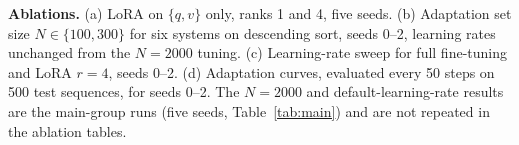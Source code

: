 \textbf{Ablations.} (a) LoRA on $\{q,v\}$ only, ranks 1 and 4, five seeds. (b) Adaptation set size $N\in\{100,300\}$ for six systems on descending sort, seeds 0--2, learning rates unchanged from the $N=2000$ tuning. (c) Learning-rate sweep for full fine-tuning and LoRA $r=4$, seeds 0--2. (d) Adaptation curves, evaluated every 50 steps on 500 test sequences, for seeds 0--2. The $N=2000$ and default-learning-rate results are the main-group runs (five seeds, Table~\ref{tab:main}) and are not repeated in the ablation tables.
